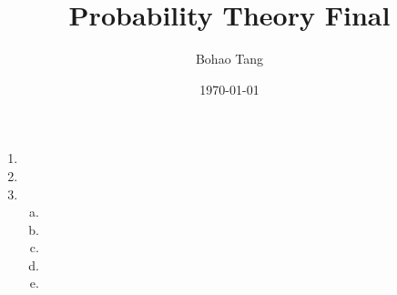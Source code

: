 \documentclass[11pt]{article}
\title{Probability Theory Final}
\author{Bohao Tang}
\date{\today}
\begin{document}

\maketitle

\begin{enumerate}
    \item

    \item

    \item
        \begin{enumerate}[(a)]
            \item

            \item

            \item

            \item

            \item
            
        \end{enumerate}
\end{enumerate}
\end{document}
